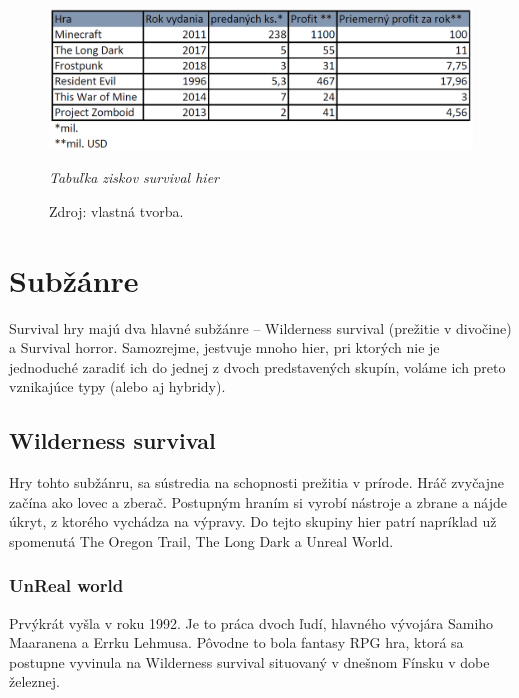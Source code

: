 \documentclass[10pt,oneoside,slovak,a4paper]{article}
\begin{document}
\begin{figure}[h]
	\begin{flushleft}
		
		\includegraphics[width=12.5cm,keepaspectratio]{tabulka.png}
		\caption{\textit{Tabuľka ziskov survival hier}}
		\label{ fig:Tabuľka ziskov survival hier}
  		\caption*{Zdroj: vlastná tvorba.}
		
	\end{flushleft}
\end{figure}







\section{Subžánre} 
Survival hry majú dva hlavné subžánre – Wilderness survival (prežitie v divočine) a Survival  horror.  Samozrejme, jestvuje mnoho hier, pri ktorých nie je jednoduché zaradiť ich do jednej z dvoch predstavených skupín, voláme ich preto vznikajúce typy (alebo aj hybridy).\cite{Reid}

\subsection{Wilderness survival}

Hry tohto subžánru, sa sústredia na schopnosti prežitia v prírode. Hráč zvyčajne začína ako lovec a zberač. Postupným hraním si vyrobí nástroje a zbrane a nájde úkryt, z ktorého vychádza na výpravy. Do tejto skupiny hier patrí napríklad už spomenutá The Oregon Trail, The Long Dark a Unreal World.\cite{Wilds}

\subsubsection{UnReal world}
Prvýkrát vyšla v roku 1992. Je to práca dvoch ľudí, hlavného vývojára Samiho Maaranena a Errku Lehmusa. Pôvodne to bola fantasy RPG hra, ktorá sa postupne vyvinula na Wilderness survival situovaný v dnešnom Fínsku v dobe železnej. 
\end{document}
